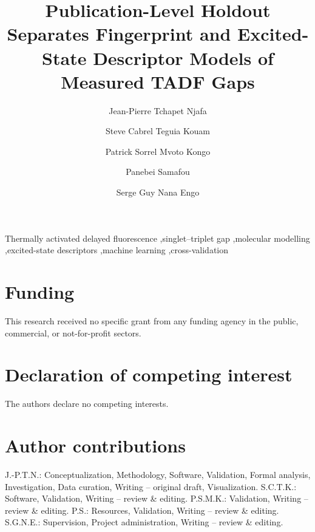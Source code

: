 \documentclass[final,3p,times,twocolumn]{elsarticle}
\begin{document}
\begin{frontmatter}
\title{Publication-Level Holdout Separates Fingerprint and Excited-State Descriptor Models of Measured TADF Gaps}
\author[aff1]{Jean-Pierre Tchapet Njafa}
\author[aff2]{Steve Cabrel Teguia Kouam}
\author[aff1]{Patrick Sorrel Mvoto Kongo}
\author[aff3]{Panebei Samafou}
\author[aff1]{Serge Guy Nana Engo}
\begin{abstract}

\end{abstract}
\begin{keyword}
Thermally activated delayed fluorescence \sep singlet--triplet gap \sep molecular modelling \sep excited-state descriptors \sep machine learning \sep cross-validation
\end{keyword}
\end{frontmatter}






\section*{Funding}
This research received no specific grant from any funding agency in the public,
commercial, or not-for-profit sectors.
\section*{Declaration of competing interest}
The authors declare no competing interests.
\section*{Author contributions}
J.-P.T.N.: Conceptualization, Methodology, Software, Validation, Formal analysis, Investigation, Data curation, Writing -- original draft, Visualization.
S.C.T.K.: Software, Validation, Writing -- review \& editing.
P.S.M.K.: Validation, Writing -- review \& editing.
P.S.: Resources, Validation, Writing -- review \& editing.
S.G.N.E.: Supervision, Project administration, Writing -- review \& editing.
\end{document}
